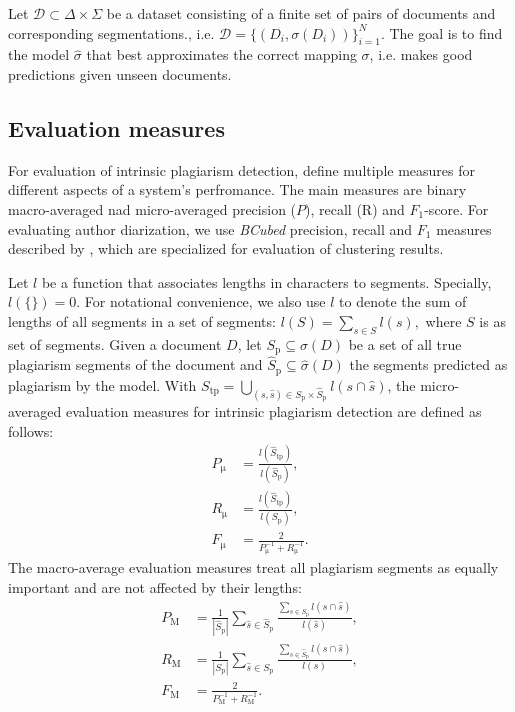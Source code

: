 \documentclass[10pt, a4paper]{article}
\begin{document}
Let $\mathcal{D} \subset \Delta\times\Sigma$ be a dataset consisting of a finite set of pairs of documents and corresponding segmentations., i.e. $\mathcal{D} = \{\left(D_i, \sigma(D_i)\right)\}_{i=1}^N$. The goal is to find the model $\hat{\sigma}$ that best approximates the correct mapping $\sigma$, i.e. makes good predictions given unseen documents.

\subsection{Evaluation measures}

For evaluation of intrinsic plagiarism detection, \citet{stein-2010} define multiple measures for different aspects of a system's perfromance. The main measures are binary macro-averaged nad micro-averaged precision ($P$), recall (R) and $F_1$-score. For evaluating author diarization, we use \emph{BCubed} precision, recall and $F_1$ measures described by \citet{amigo-2009}, which are specialized for evaluation of clustering results.

Let $l$ be a function that associates lengths in characters to segments. Specially, $l(\{\}) = 0$. For notational convenience, we also use $l$ to denote the sum of lengths of all segments in a set of segments: $l(S) = \sum_{s\in S} l(s),$ where $S$ is as set of segments. Given a document $D$, let $S_\mathrm{p} \subseteq \sigma(D)$ be a set of all true plagiarism segments of the document and $\hat{S}_\mathrm{p} \subseteq \hat{\sigma}(D)$ the segments predicted as plagiarism by the  model. With ${S_\mathrm{tp} = \bigcup_{(s,\hat{s})\in S_\mathrm{p}\times\hat{S}_\mathrm{p}} l(s\cap\hat{s})}$, the micro-averaged evaluation measures for intrinsic plagiarism detection are defined as follows:
\begin{align}
P_\mathrm{\mu} &= \frac{l(\hat{S}_\mathrm{tp})}{l(\hat{S}_\mathrm{p})}, \\
R_\mathrm{\mu} &= \frac{l(\hat{S}_\mathrm{tp})}{l(S_\mathrm{p})}, \\
F_\mathrm{\mu} &= \frac{2}{P_\mathrm{\mu}^{-1}+R_\mathrm{\mu}^{-1}}.
\end{align}
The macro-average evaluation measures treat all plagiarism segments as equally important and are not affected by their lengths:
\begin{align}
P_\mathrm{M} &= \frac{1}{|\hat{S}_\mathrm{p}|}
	\sum_{\hat{s}\in\hat{S}_\mathrm{p}}
		\frac{{\sum_{s\in S_\mathrm{p}} l(s\cap\hat{s})}}{l(\hat{s})}, \\
R_\mathrm{M} &= \frac{1}{|S_\mathrm{p}|}
	\sum_{\hat{s}\in S_\mathrm{p}}
		\frac{{\sum_{s\in \hat{S}_\mathrm{p}} l(s\cap\hat{s})}}{l(s)}, \\
F_\mathrm{M} &= \frac{2}{P_\mathrm{M}^{-1}+R_\mathrm{M}^{-1}}.
\end{align}
\end{document}
